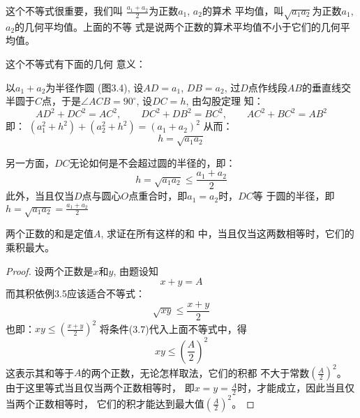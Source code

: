 这个不等式很重要，我们叫
$\frac{a_1+a_2}{2}$为正数$a_1$, $a_2$的算术
平均值，叫$\sqrt{a_1a_2}$为正数$a_1$, $a_2$的几何平均值。上面的不等
式是说两个正数的算术平均值不小于它们的几何平均值。

这个不等式有下面的几何
意义：

\begin{figure}[htp]
    \centering
{} 
    \caption{}
\end{figure}


以$a_1+a_2$为半径作圆
(图3.4), 设$AD=a_1$, $DB=a_2$,
过$D$点作线段$AB$的垂直线交
半圆于$C$点，于是$\angle ACB=
90^{\circ}$, 设$DC=h$, 由勾股定理
知：
\[AD^2+DC^2=AC^2,\qquad DC^2+DB^2=BC^2,\qquad AC^2+BC^2=AB^2\]
即：
$(a_1^2+h^2)+(a_2^2+h^2) =(a_1+a_2)^2$
从而：
\[h=\sqrt{a_1a_2}\]

另一方面，$DC$无论如何是不会超过圆的半径的，即：
\[h=\sqrt{a_1a_2}\le \frac{a_1+a_2}{2}\]
此外，当且仅当$D$点与圆心$O$点重合时，即$a_1=a_2$时，$DC$等
于圆的半径，即$h=\sqrt{a_1a_2}=\frac{a_1+a_2}{2}$    

\begin{example}
    两个正数的和是定值$A$, 求证在所有这样的和
中，当且仅当这两数相等时，它们的乘积最大。
\end{example}

\begin{proof}
设两个正数是$x$和$y$, 由题设知
\begin{equation}
   x+y=A 
\end{equation}
而其积依例3.5应该适合不等式：
\[\sqrt{xy}\le \frac{x+y}{2}\]
也即：$xy\le \left(\frac{x+y}{2}\right)^2$
将条件(3.7)代入上面不等式中，得
\[xy\le \left(\frac{A}{2}\right)^2\]
这表示其和等于$A$的两个正数，无论怎样取法，它们的积都
不大于常数$\left(\frac{A}{2}\right)^2$。
由于这里等式当且仅当两个正数相等时，
即$x=y=\frac{A}{2}$时，才能成立，因此当且仅当两个正数相等时，
它们的积才能达到最大值$\left(\frac{A}{2}\right)^2$。

\end{proof}
    
